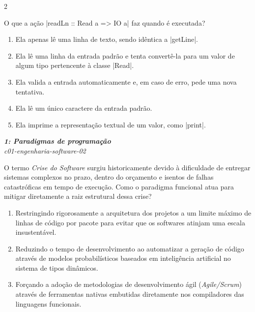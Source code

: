 \documentclass[a4paper,10pt,brazil]{article}
\begin{document}
\begin{multicols}{2}
\begin{flushright}
\end{flushright}
O que a ação \haskellinline|readLn :: Read a => IO a| faz quando é executada?

\begin{enumerate}
  \item Ela apenas lê uma linha de texto, sendo idêntica a \haskellinline|getLine|.

  \item Ela lê uma linha da entrada padrão e tenta convertê-la para um valor de algum tipo pertencente à classe \haskellinline|Read|.

  \item Ela valida a entrada automaticamente e, em caso de erro, pede uma nova tentativa.

  \item Ela lê um único caractere da entrada padrão.

  \item Ela imprime a representação textual de um valor, como \haskellinline|print|.


\end{enumerate}

\begin{flushright}
  \footnotesize
  \textit{\textbf{1: Paradigmas de programação}}\\
  \textit{c01-engenharia-software-02}\\

\end{flushright}
O termo \emph{Crise do Software} surgiu historicamente devido à dificuldade de entregar sistemas complexos no prazo, dentro do orçamento e isentos de falhas catastróficas em tempo de execução. Como o paradigma funcional atua para mitigar diretamente a raiz estrutural dessa crise?

\begin{enumerate}
  \item Restringindo rigorosamente a arquitetura dos projetos a um limite máximo de linhas de código por pacote para evitar que os softwares atinjam uma escala insustentável.

  \item Reduzindo o tempo de desenvolvimento ao automatizar a geração de código através de modelos probabilísticos baseados em inteligência artificial no sistema de tipos dinâmicos.

  \item Forçando a adoção de metodologias de desenvolvimento ágil (\emph{Agile/Scrum}) através de ferramentas nativas embutidas diretamente nos compiladores das linguagens funcionais.


\end{enumerate}
\end{multicols}
\end{document}
